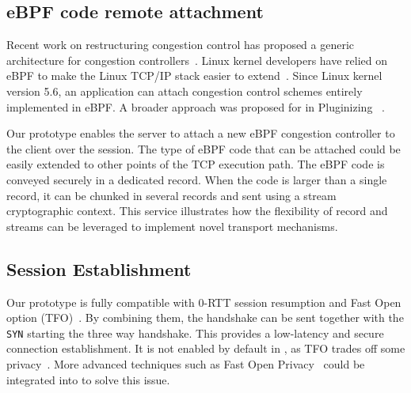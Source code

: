 \subsection{eBPF code remote attachment}
\label{sec:prot-ebpf}

Recent work on restructuring congestion control has proposed a generic 
architecture for congestion controllers~\cite{narayan2018restructuring}.
Linux kernel developers have relied on eBPF to make the Linux TCP/IP 
stack easier to extend~\cite{brakmo2017tcp,tran2020beyond}. Since Linux kernel 
version 5.6, an application can attach congestion control schemes 
entirely implemented in eBPF. A broader approach was proposed for \quic in 
Pluginizing \quic~\cite{de2019pluginizing}. 

Our \tcpls prototype enables the server %
to attach a new eBPF congestion controller to the client over the \tcpls 
session. The type of eBPF code 
that can be attached could be easily extended to other points of the TCP 
execution path.
The eBPF code is conveyed securely in a dedicated \tcpls record. When 
the code is larger than a single \tls record, it can be chunked in several 
records and sent using a \tcpls stream cryptographic context. This service 
illustrates how the flexibility of \tcpls record and streams can be leveraged 
to implement novel transport mechanisms.

\subsection{\tcpls Session Establishment}

Our prototype is fully compatible with  0-RTT session resumption
and \tcp Fast Open option (TFO)~\cite{radhakrishnan2011tcp}. By combining them,
the \tcpls handshake can be sent together with the \tcp \texttt{SYN} starting 
the three way handshake. This provides a low-latency and secure connection establishment.
It is not enabled by default in \tcpls, as TFO trades off some privacy~\cite{sy2020enhanced}.
More advanced techniques such as \tcp Fast Open Privacy~\cite{sy2020enhanced} 
could be
integrated into \tcpls to solve this issue.

